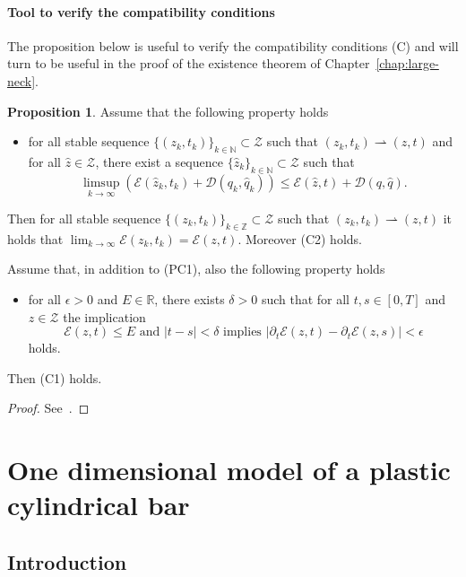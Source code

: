 \documentclass[a4paper,10pt,oneside]{amsbook}
\numberwithin{section}{chapter}
\numberwithin{equation}{chapter}
\theoremstyle{definition}
\newtheorem{prop}{Proposition}[chapter]
\begin{document}
\subsection{Tool to verify the compatibility conditions}

The proposition below is useful to verify the compatibility conditions (C) and will turn to be useful in the proof of the existence theorem of Chapter~\ref{chap:large-neck}. 
\begin{prop}
\label{prop:tool-verify-compatibility}
Assume that the following property holds
\begin{itemize}
\item[(PC1)] for all stable sequence $\{(z_k,t_k)\}_{k\in\mathbb{N}}\subset\mathscr{Z}$ such that $(z_k,t_k)\rightharpoonup(z,t)$ and for all $\hat{z}\in\mathscr{Z}$, there exist a sequence $\{\hat{z}_k\}_{k\in\mathbb{N}}\subset\mathscr{Z}$ such that
\[
\limsup_{k\to\infty}\left(\mathcal{E}(\hat{z}_k,t_k)+\mathcal{D}(q_k,\hat{q}_k)\right)\le\mathcal{E}(\hat{z},t)+\mathcal{D}(q,\hat{q}).
\]
\end{itemize}
Then for all stable sequence $\{(z_k,t_k)\}_{k\in\mathbb{Z}}\subset\mathscr{Z}$ such that $(z_k,t_k)\rightharpoonup(z,t)$ it holds that $\lim_{k\to\infty}\mathcal{E}(z_k,t_k)=\mathcal{E}(z,t)$. Moreover (C2) holds.

Assume that, in addition to (PC1), also the following property holds
\begin{itemize}
\item[(PC2)] for all $\epsilon>0$ and $E\in\mathbb{R}$, there exists $\delta>0$ such that for all $t,s\in[0,T]$ and $z\in\mathscr{Z}$ the implication
\begin{equation}
\text{$\mathcal{E}(z,t)\le E$ and $|t-s|<\delta$ implies $|\partial_t\mathcal{E}(z,t)-\partial_t\mathcal{E}(z,s)|<\epsilon$}
\end{equation}
holds.
\end{itemize}
Then (C1) holds.
\end{prop}
\begin{proof}
See~\cite{francfort}.
\end{proof}

%

\part{One dimensional model of a plastic cylindrical bar}
\label{part:his-model}

\chapter{Introduction}
\label{chap:intro-neck}
\end{document}
